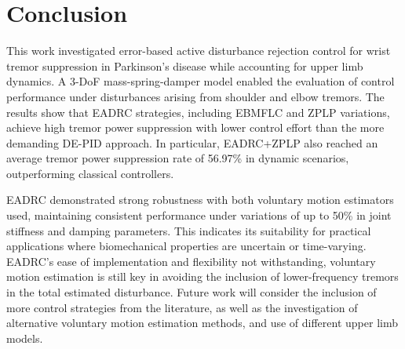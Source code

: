 \section{Conclusion}
\label{sec:conclusion}

This work investigated error-based active disturbance rejection control for wrist tremor suppression in Parkinson's disease while accounting for upper limb dynamics. A 3-DoF mass-spring-damper model enabled the evaluation of control performance under disturbances arising from shoulder and elbow tremors. The results show that EADRC strategies, including EBMFLC and ZPLP variations, achieve high tremor power suppression with lower control effort than the more demanding DE-PID approach. 
%
%
In particular, EADRC+ZPLP also reached an average tremor power suppression rate of 56.97\% in dynamic scenarios, outperforming classical controllers.

EADRC demonstrated strong robustness with both voluntary motion estimators used, maintaining consistent performance under variations of up to 50\% in joint stiffness and damping parameters. This indicates its suitability for practical applications where biomechanical properties are uncertain or time-varying. 
%
EADRC's ease of implementation and flexibility not withstanding, voluntary motion estimation is still key in avoiding the inclusion of lower-frequency tremors in the total estimated disturbance.
%
Future work will consider the inclusion of more control strategies from the literature, 
as well as the investigation of alternative voluntary motion estimation methods, and use of different upper limb models.